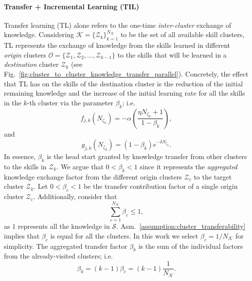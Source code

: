 \paragraph{\textbf{Transfer + Incremental Learning (TIL)}}
Transfer learning (TL) alone refers to the one-time \emph{inter-cluster} exchange of knowledge. Considering $\mathcal{K} = \{ \mathcal{Z}_k \}^{N_\mathcal{K}}_{k=1}$ to be the set of all available skill clusters, TL represents the exchange of knowledge from the skills learned in different \emph{origin} clusters $\mathcal{O} = \{ \mathcal{Z}_1,\mathcal{Z}_2,\ldots,\mathcal{Z}_{k-1} \}$ to the skills that will be learned in a \emph{destination} cluster $\mathcal{Z}_k$ (see Fig.~\ref{fig:cluster_to_cluster_knowledge_transfer_parallel}). Concretely, the effect that TL has on the skills of the destination cluster is the reduction of the initial remaining knowledge and the increase of the initial learning rate for all the skills in the $k$-th cluster via the parameter $\beta_k$; i.e.
\begin{equation}\label{eq:f_function_transfer}
	f_{j,k}\left(N_{\zeta_k}\right) = -\alpha \left( \frac{\eta N_{\zeta_k} + 1}{1 - \beta_k} \right),
\end{equation}
and
\begin{equation}\label{eq:g_function_transfer}
	g_{j,k}\left(N_{\zeta_k}\right) = (1-\beta_k) e^{-\delta N_{\zeta_k}}.
\end{equation}
In essence, $\beta_k$ is the head start granted by knowledge transfer from other clusters to the skills in $\mathcal{Z}_k$. We argue that  $0<\beta_{k} < 1$ since it represents the \emph{aggregated} knowledge exchange factor from the different origin clusters $\mathcal{Z}_{c}$ to the target cluster $\mathcal{Z}_{k}$. Let $0<\beta_{c} < 1$ be the transfer contribution factor of a single origin cluster $\mathcal{Z}_c$. Additionally, consider that
\begin{equation}
	\sum\limits_{c=1}^{N_\mathcal{K}}\beta_{c} \leq 1,
\end{equation}
as $1$ represents all the knowledge in $\mathcal{S}$. Asm.~\ref{assumption:cluster_transferability} implies that $\beta_c$ is equal for all the clusters. In this work we select $\beta_c = 1/N_\mathcal{K}$ for simplicity. The aggregated transfer factor $\beta_k$ is the sum of the individual factors from the already-visited clusters; i.e.
\begin{equation}\label{eq:beta_k_transfer}
	\beta_{k}= \left(k-1\right)\beta_c = \left(k-1\right)\frac{1}{N_\mathcal{K}}.
\end{equation}

